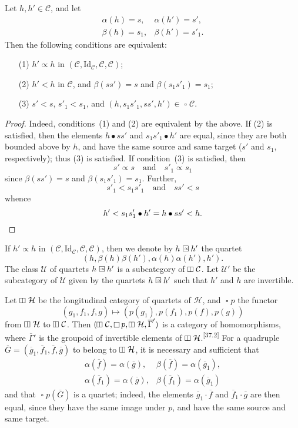 \documentclass[a4paper,fleqn]{article}
\makeatletter
\theoremstyle{plain}
\newenvironment{proposition}[1]
  {\renewcommand\theinnerproposition{#1}\innerproposition}
  {\endinnerproposition}
\theoremstyle{definition}
\def\blfootnote{\xdef\@thefnmark{}\@footnotetext}
\newcommand{\comm}[2]{{\normalfont\textsuperscript{[#1]}}\blfootnote{\label{footnote:#1}\textbf{[#1]} #2}}
\newcommand{\textand}{\quad\text{and}\quad}
\newcommand{\CC}{\mathcal{C}}
\newcommand{\HH}{\mathcal{H}}
\newcommand{\UU}{\mathcal{U}}
\newcommand{\subs}{\mathrel{\propto}}
\newcommand{\Id}{\mathrm{Id}}
\newcommand{\vsqbox}{{\rotatebox{90}{$\boxminus$}}}
\DeclareMathOperator{\sq}{\square}
\DeclareMathOperator{\vsq}{\raisebox{-.1em}{$\vsqbox$\,}}
\newcommand{\sqsubs}{\mathrel{\mathrlap{\square}\raisebox{.17em}{\scaleobj{0.65}{\,\,\propto}}}}
\makeatother
\begin{document}
\begin{proposition}{8}
\label{proposition:i-8}
  Let $h,h'\in\CC$, and let
  \[
    \begin{array}{ll}
      \alpha(h)
      = s,
      &\alpha(h')
      = s',
    \\\beta(h)
      = s_1,
      &\beta(h')
      = s'_1.
    \end{array}
  \]
  Then the following conditions are equivalent:
  \begin{enumerate}
    \item[\normalfont(1)]
      $h'\subs h$ in $(\CC,\Id_\CC,\CC,\CC)$;
    \item[\normalfont(2)]
      $h'<h$ in $\CC$, and $\beta(ss')=s$ and $\beta(s_1s'_1)=s_1$;
    \item[\normalfont(3)]
      $s'<s$, $s'_1<s_1$, and $(h,s_1s'_1,ss',h')\in\sq\CC$.
  \end{enumerate}
\end{proposition}

\begin{proof}
  Indeed, conditions~(1) and (2) are equivalent by the above.
  If (2) is satisfied, then the elements $h\bullet ss'$ and $s_1s'_1\bullet h'$ are equal, since they are both bounded above by $h$, and have the same source and same target ($s'$ and $s_1$, respectively);
  thus (3) is satisfied.
  If condition~(3) is satisfied, then
  \[
    s'\subs s
    \textand
    s'_1\subs s_1
  \]
  since $\beta(ss')=s$ and $\beta(s_1s'_1)=s_1$.
  Further,
  \[
    s'_1<s_1s'_1
    \textand
    ss'<s
  \]
  whence
  \[
    h'
    < s_1s'_1\bullet h'
    = h\bullet ss'
    < h.
    \qedhere
  \]
\end{proof}

If $h'\subs h$ in $(\CC,\Id_\CC,\CC,\CC)$, then we denote by $h\sqsubs h'$ the quartet
\[
  (h,\beta(h)\beta(h'),\alpha(h)\alpha(h'),h').
\]
The class $\UU$ of quartets $h\sqsubs h'$ is a subcategory of $\vsq\CC$.
Let $\UU'$ be the subcategory of $\UU$ given by the quartets $h\sqsubs h'$ such that $h'$ and $h$ are invertible.

Let $\vsq\HH$ be the longitudinal category of quartets of $\HH$, and $\sq p$ the functor
\[
  (g_1,f_1,f,g)
  \longmapsto (p(g_1),p(f_1),p(f),p(g))
\]
from $\vsq\HH$ to $\vsq\CC$.
Then $(\vsq\CC,\sq p,\vsq\HH,\overline{\Gamma}')$ is a category of homomorphisms, where $\overline{\Gamma}'$ is the groupoid of invertible elements of $\vsq\HH$.\comm{37.2}{This is easy to prove (cf. \cite[Chapter~II]{coll122}).}
For a quadruple $\overline{G}=(\overline{g}_1,\overline{f}_1,\overline{f},\overline{g})$ to belong to $\vsq\HH$, it is necessary and sufficient that
\[
  \begin{array}{ll}
    \alpha(\overline{f})=\alpha(\overline{g}),
    & \beta(\overline{f})=\alpha(\overline{g}_1),
  \\\alpha(\overline{f}_1)=\alpha(\overline{g}),
    & \beta(\overline{f}_1)=\alpha(\overline{g}_1)
  \end{array}
\]
and that $\sq p(\overline{G})$ is a quartet;
indeed, the elements $\overline{g}_1\cdot\overline{f}$ and $\overline{f}_1\cdot\overline{g}$ are then equal, since they have the same image under $p$, and have the same source and same target.
\end{document}
